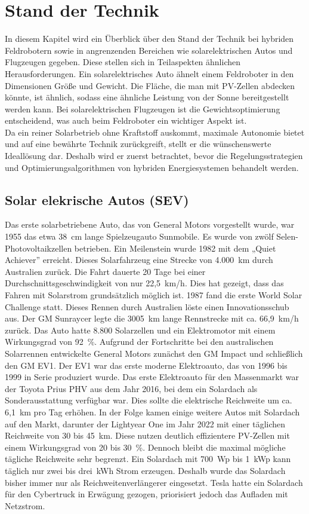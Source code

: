 \clearpage
\section{Stand der Technik}
In diesem Kapitel wird ein Überblick über den Stand der Technik bei hybriden Feldrobotern sowie in angrenzenden Bereichen wie solarelektrischen Autos und Flugzeugen gegeben. Diese stellen sich in Teilaspekten ähnlichen Herausforderungen. Ein solarelektrisches Auto ähnelt einem Feldroboter in den Dimensionen Größe und Gewicht. Die Fläche, die man mit PV-Zellen abdecken könnte, ist ähnlich, sodass eine ähnliche Leistung von der Sonne bereitgestellt werden kann. Bei solarelektrischen Flugzeugen ist die Gewichtsoptimierung entscheidend, was auch beim Feldroboter ein wichtiger Aspekt ist. \\
Da ein reiner Solarbetrieb ohne Kraftstoff auskommt, maximale Autonomie bietet und auf eine bewährte Technik zurückgreift, stellt er die wünschenswerte Ideallösung dar. Deshalb wird er zuerst betrachtet, bevor die Regelungsstrategien und Optimierungsalgorithmen von hybriden Energiesystemen behandelt werden.


\subsection{Solar elekrische Autos (SEV)}
Das erste solarbetriebene Auto, das von General Motors vorgestellt wurde, war 1955 das etwa 38~cm lange Spielzeugauto Sunmobile.
Es wurde von zwölf Selen-Photovoltaikzellen betrieben.
Ein Meilenstein wurde 1982 mit dem „Quiet Achiever” erreicht. Dieses Solarfahrzeug eine Strecke von 4.000~km durch Australien zurück. Die Fahrt dauerte 20 Tage bei einer Durchschnittsgeschwindigkeit von nur 22,5~km/h. Dies hat gezeigt, dass das Fahren mit Solarstrom grundsätzlich möglich ist.
1987 fand die erste World Solar Challenge statt. Dieses Rennen durch Australien löste einen Innovationsschub aus. Der GM Sunraycer legte die 3005~km lange Rennstrecke mit ca. 66,9~km/h zurück. Das Auto hatte 8.800 Solarzellen und ein Elektromotor mit einem Wirkungsgrad von 92~\%.
Aufgrund der Fortschritte bei den australischen Solarrennen entwickelte General Motors zunächst den GM Impact und schließlich den GM EV1. Der EV1 war das erste moderne Elektroauto, das von 1996 bis 1999 in Serie produziert wurde.
Das erste Elektroauto für den Massenmarkt war der Toyota Prius PHV aus dem Jahr 2016, bei dem ein Solardach als Sonderausstattung verfügbar war. Dies sollte die elektrische Reichweite um ca. 6,1~km pro Tag erhöhen. 
In der Folge kamen einige weitere Autos mit Solardach auf den Markt, darunter der Lightyear One im Jahr 2022 mit einer täglichen Reichweite von 30 bis 45~km. Diese nutzen deutlich effizientere PV-Zellen mit einem Wirkungsgrad von 20 bis 30~\%. 
Dennoch bleibt die maximal mögliche tägliche Reichweite sehr begrenzt. Ein Solardach mit 700~Wp bis 1~kWp kann täglich nur zwei bis drei~kWh Strom erzeugen. Deshalb wurde das Solardach bisher immer nur als Reichweitenverlängerer eingesetzt. 
Tesla hatte ein Solardach für den Cybertruck in Erwägung gezogen, priorisiert jedoch das Aufladen mit Netzstrom. \cite{oluwalana_solar-powered-cars_2025} 


